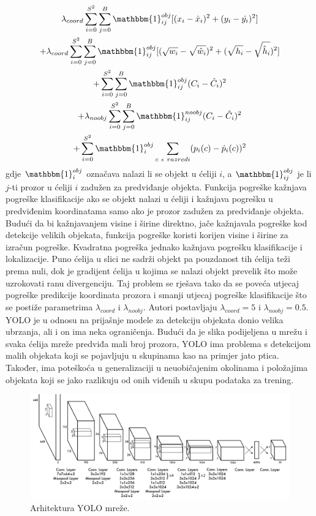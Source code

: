 \begin{multline}
 	\lambda_{coord} \sum\limits_{i=0}^{S^2} \sum\limits_{j=0}^{B} \mathbbm{1}_{ij}^{obj}[(x_i - \hat{x}_i )^2 + (y_i - \hat{y_i})^2] \\
 	+ \lambda_{coord} \sum\limits_{i=0}^{S^2} \sum\limits_{j=0}^{B} \mathbbm{1}_{ij}^{obj} [(\sqrt{w_i} - \sqrt{\hat{w}_i})^2 + (\sqrt{h_i} - \sqrt{\hat{h}_i})^2] \\
 	+ \sum\limits_{i=0}^{S^2} \sum\limits_{j=0}^{B} \mathbbm{1}_{ij}^{obj}(C_i - \hat{C}_i)^2 \\
 	+ \lambda_{noobj} \sum\limits_{i=0}^{S^2} \sum\limits_{j=0}^{B} \mathbbm{1}_{ij}^{noobj}(C_i - \hat{C}_i)^2 \\
 	+ \sum\limits_{i=0}^{S^2} \mathbbm{1}_{i}^{obj} \sum\limits_{c \ \epsilon \ razredi} (p_i(c) - \hat{p}_i(c))^2
\end{multline}
gdje $\mathbbm{1}_{i}^{obj}$ označava nalazi li se objekt u ćeliji $i$, a $\mathbbm{1}_{ij}^{obj}$ je li $j$-ti prozor u ćeliji $i$ zadužen za predviđanje objekta. Funkcija pogreške kažnjava pogreške klasifikacije ako se objekt nalazi u ćeliji i kažnjava pogrešku u predviđenim koordinatama samo ako je prozor zadužen za predviđanje objekta. Budući da bi kažnjavanjem visine i širine direktno, jače kažnjavala pogreške kod detekcije velikih objekata, funkcija pogreške koristi korijen visine i širine za izračun pogreške. Kvadratna pogreška jednako kažnjava pogrešku klasifikacije i lokalizacije. Puno ćelija u slici ne sadrži objekt pa pouzdanost tih ćelija teži prema nuli, dok je gradijent ćelija u kojima se nalazi objekt prevelik što može uzrokovati ranu divergenciju. Taj problem se rješava tako da se poveća utjecaj pogreške predikcije koordinata prozora i smanji utjecaj pogreške klasifikacije što se postiže parametrima $\lambda_{coord}$ i $\lambda_{noobj}$. Autori postavljaju $\lambda_{coord} = 5$ i $\lambda_{noobj} = 0.5$. YOLO je u odnosu na prijašnje modele za detekciju objekata donio velika ubrzanja, ali i on ima neka ograničenja. Budući da je slika podijeljena u mrežu i svaka ćelija mreže predviđa mali broj prozora, YOLO ima problema s detekcijom malih objekata koji se pojavljuju u skupinama kao na primjer jato ptica. Također, ima poteškoća u generalizaciji u neuobičajenim okolinama i položajima objekata koji se jako razlikuju od onih viđenih u skupu podataka za trening.
 
 \begin{figure}
	\centering
	\includegraphics[scale=0.5]{img/yolo_mreza.png}
	\caption{Arhitektura YOLO mreže.}
	\label{yolo_mreza}
\end{figure}

